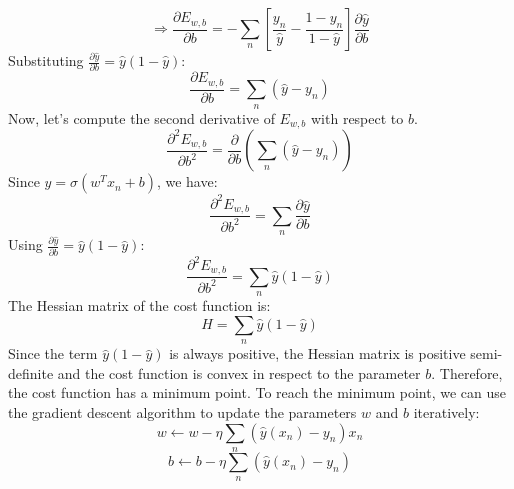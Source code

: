 \begin{qsolve}
\begin{qsolve}[]
\[        \] 
        \[
        \Rightarrow \frac{\partial E_{w, b}}{\partial b} = -\sum_n \left[ \frac{y_n}{\hat{y}} - \frac{1 - y_n}{1 - \hat{y}} \right] \frac{\partial \hat{y}}{\partial b}
        \]
        Substituting \( \frac{\partial \hat{y}}{\partial b} = \hat{y}(1 - \hat{y}) \):
        \[
        \frac{\partial E_{w, b}}{\partial b} = \sum_n (\hat{y} - y_n)
        \]
        Now, let’s compute the second derivative of \( E_{w, b} \) with respect to \( b \).
        \[
        \frac{\partial^2 E_{w, b}}{\partial b^2} = \frac{\partial}{\partial b} \left( \sum_n (\hat{y} - y_n) \right)
        \]
        Since \( \hat{y} = \sigma(w^T x_n + b) \), we have:
        \[
        \frac{\partial^2 E_{w, b}}{\partial b^2} = \sum_n \frac{\partial \hat{y}}{\partial b}
        \]
        \splitqsolve[\splitqsolve]
        Using \( \frac{\partial \hat{y}}{\partial b} = \hat{y}(1 - \hat{y}) \):
        \[
        \frac{\partial^2 E_{w, b}}{\partial b^2} = \sum_n \hat{y}(1 - \hat{y})
        \]
        The Hessian matrix of the cost function is:
        \[
        H = \sum_n \hat{y}(1 - \hat{y})
        \]
        Since the term \( \hat{y}(1 - \hat{y}) \) is always positive, the Hessian matrix is positive semi-definite and the cost function is convex in respect to the parameter \( b \). Therefore, the cost function has a minimum point. To reach the minimum point, we can use the gradient descent algorithm to update the parameters \( w \) and \( b \) iteratively:
        \[
        w \leftarrow w - \eta \sum_n \left( \hat{y}(x_n) - y_n \right) x_n
        \]
        \[
        b \leftarrow b - \eta \sum_n \left( \hat{y}(x_n) - y_n \right)
        \]
    \end{qsolve}
\end{qsolve}